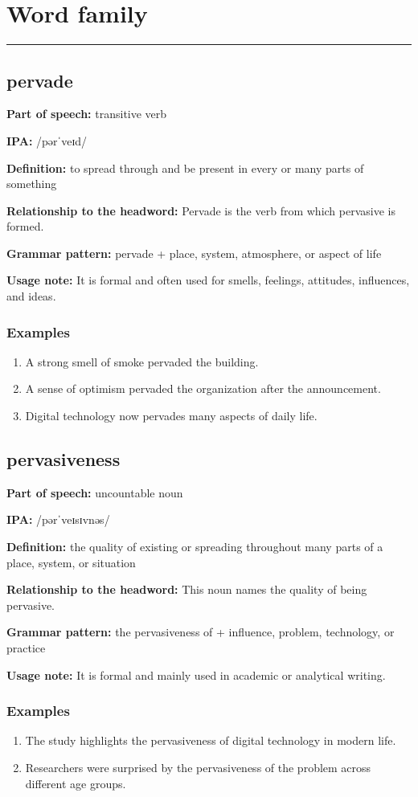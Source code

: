 \documentclass[11pt]{article}
\newcommand{\sectionrule}{\par\vspace{-0.5em}\noindent\textcolor{Accent}{\rule{\linewidth}{0.6pt}}\par}
\begin{document}
\section{Word family}
\sectionrule
\subsection{pervade}
\textbf{Part of speech:} transitive verb

\textbf{IPA:} /pərˈveɪd/

\textbf{Definition:} to spread through and be present in every or many parts of something

\textbf{Relationship to the headword:} Pervade is the verb from which pervasive is formed.

\textbf{Grammar pattern:} pervade + place, system, atmosphere, or aspect of life

\textbf{Usage note:} It is formal and often used for smells, feelings, attitudes, influences, and ideas.

\subsubsection{Examples}
\begin{enumerate}
  \item A strong smell of smoke pervaded the building.
  \item A sense of optimism pervaded the organization after the announcement.
  \item Digital technology now pervades many aspects of daily life.
\end{enumerate}

\subsection{pervasiveness}
\textbf{Part of speech:} uncountable noun

\textbf{IPA:} /pərˈveɪsɪvnəs/

\textbf{Definition:} the quality of existing or spreading throughout many parts of a place, system, or situation

\textbf{Relationship to the headword:} This noun names the quality of being pervasive.

\textbf{Grammar pattern:} the pervasiveness of + influence, problem, technology, or practice

\textbf{Usage note:} It is formal and mainly used in academic or analytical writing.

\subsubsection{Examples}
\begin{enumerate}
  \item The study highlights the pervasiveness of digital technology in modern life.
  \item Researchers were surprised by the pervasiveness of the problem across different age groups.
\end{enumerate}
\end{document}
